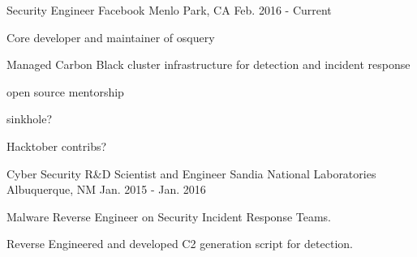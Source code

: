 


\begin{cventries}




\cventry
{Security Engineer} %
{Facebook} %
{Menlo Park, CA} %
{Feb. 2016 - Current} %
{ %
\begin{cvitems}
\item {Core developer and maintainer of osquery}
\item {Managed Carbon Black cluster infrastructure for detection and incident response}
\item {open source mentorship}
\item {sinkhole?}
\item {Hacktober contribs?}
\end{cvitems}
}


\cventry
{Cyber Security R\&D Scientist and Engineer} %
{Sandia National Laboratories} %
{Albuquerque, NM} %
{Jan. 2015 - Jan. 2016} %
{ %
\begin{cvitems}
\item {Malware Reverse Engineer on Security Incident Response Teams.}
\item {Reverse Engineered and developed C2 generation script for detection.}
\end{cvitems}
}


\end{cventries}

